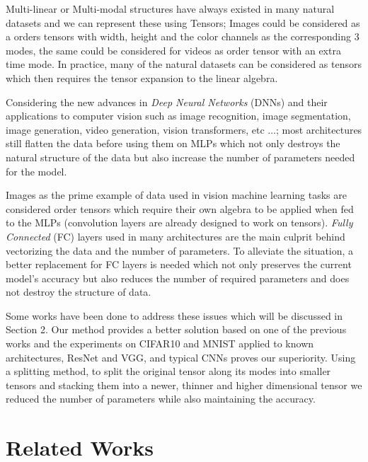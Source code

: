 \documentclass[runningheads]{llncs}
\begin{document}
Multi-linear or Multi-modal structures have always existed in many natural datasets and we can represent these using Tensors; Images could be considered as a  orders tensors with width, height and the color channels as the corresponding 3 modes, the same could be considered for videos as  order tensor with an extra time mode. In practice, many of the natural datasets can be considered as tensors which then requires the tensor expansion to the linear algebra. 

Considering the new advances in \textit{Deep Neural Networks} (DNNs) and their applications to computer vision such as image recognition, image segmentation, image generation, video generation, vision transformers, etc $\dots$; most architectures still flatten the data before using them on MLPs which not only destroys the natural structure of the data but also increase the number of parameters needed for the model. 

Images as the prime example of data used in vision machine learning tasks are considered  order tensors which require their own algebra to be applied when fed to the MLPs (convolution layers are already designed to work on tensors). \textit{Fully Connected} (FC) layers used in many architectures are the main culprit behind vectorizing the data and the number of parameters. To alleviate the situation, a better replacement for FC layers is needed which not only preserves the current model's accuracy but also reduces the number of required parameters and does not destroy the structure of data. 

Some works have been done to address these issues which will be discussed in Section 2. Our method provides a better solution based on one of the previous works and the experiments on CIFAR10 and MNIST applied to known architectures, ResNet and VGG, and typical CNNs proves our superiority. Using a splitting method, to split the original tensor along its modes into smaller tensors and stacking them into a newer, thinner and higher dimensional tensor we reduced the number of parameters while also maintaining the accuracy.  



\section{Related Works}
\end{document}
